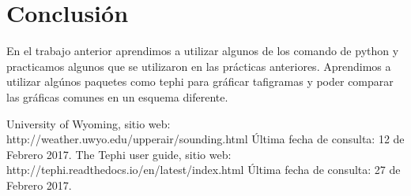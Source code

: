 \documentclass[12pt]{article}
\begin{document}
\newpage
\section{Conclusión}
En el trabajo anterior aprendimos a utilizar algunos de los comando de python y practicamos algunos que se utilizaron en las prácticas anteriores. 
Aprendimos a utilizar algúnos paquetes como tephi para gráficar tafigramas y poder comparar las gráficas comunes en un esquema diferente. 

\begin{thebibliography}{9}
University of Wyoming, sitio web: http://weather.uwyo.edu/upperair/sounding.html Última fecha de consulta: 12 de Febrero 2017.
The Tephi user guide, sitio web: http://tephi.readthedocs.io/en/latest/index.html Última fecha de consulta: 27 de Febrero 2017.
\end{thebibliography}
\end{document}
